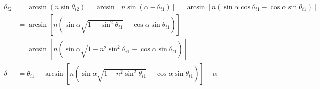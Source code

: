 \begin{equation*}
  \begin{aligned}
    \theta_{t2} &= \arcsin \left( n \sin \theta_{i2} \right) = \arcsin \left[ n \sin \left( \alpha - \theta_{t1} \right) \right] = \arcsin \left[ n \left( \sin \alpha \cos \theta_{t1} - \cos \alpha \sin \theta_{t1} \right) \right] \\
    &= \arcsin \left[ n \left( \sin \alpha \sqrt{1 - \sin^2 \theta_{t1}} - \cos \alpha \sin \theta_{t1} \right) \right] \\
    &= \arcsin \left[ n \left( \sin \alpha \sqrt{1 - n^2 \sin^2 \theta_{i1}} - \cos \alpha \sin \theta_{t1} \right) \right] \\
    \delta &= \theta_{i1} + \arcsin \left[ n \left( \sin \alpha \sqrt{1 - n^2 \sin^2 \theta_{i1}} - \cos \alpha \sin \theta_{t1} \right) \right] - \alpha
  \end{aligned}
\end{equation*}


